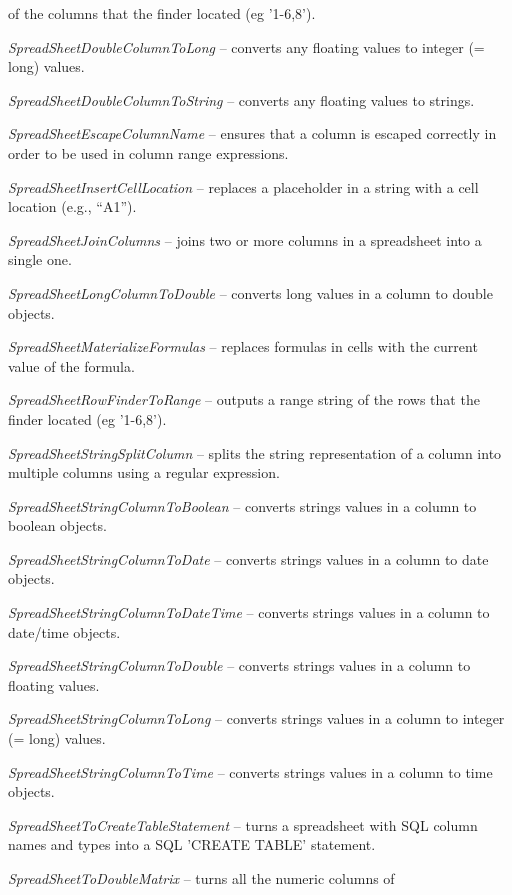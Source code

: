 \documentclass[a4paper]{book}
\begin{document}
\begin{tight_itemize}
	of the columns that the finder located (eg '1-6,8').
	\item \textit{SpreadSheetDoubleColumnToLong} -- converts any floating values
	to integer (= long) values.
	\item \textit{SpreadSheetDoubleColumnToString} -- converts any floating values
	to strings.
	\item \textit{SpreadSheetEscapeColumnName} -- ensures that a column is escaped
	correctly in order to be used in column range expressions.
	\item \textit{SpreadSheetInsertCellLocation} -- replaces a placeholder in 
	a string with a cell location (e.g., ``A1'').
	\item \textit{SpreadSheetJoinColumns} -- joins two or more columns in 
	a spreadsheet into a single one.
	\item \textit{SpreadSheetLongColumnToDouble} -- converts long values in a
	column to double objects.
	\item \textit{SpreadSheetMaterializeFormulas} -- replaces formulas in cells
	with the current value of the formula.
	\item \textit{SpreadSheetRowFinderToRange} -- outputs a range string
	of the rows that the finder located (eg '1-6,8').
	\item \textit{SpreadSheetStringSplitColumn} -- splits the string representation 
	of a column into multiple columns using a regular expression.
	\item \textit{SpreadSheetStringColumnToBoolean} -- converts strings values in a 
	column to boolean objects.
	\item \textit{SpreadSheetStringColumnToDate} -- converts strings values in a 
	column to date objects.
	\item \textit{SpreadSheetStringColumnToDateTime} -- converts strings values in a 
	column to date/time objects.
	\item \textit{SpreadSheetStringColumnToDouble} -- converts strings values in a 
	column to floating values.
	\item \textit{SpreadSheetStringColumnToLong} -- converts strings values in a 
	column to integer (= long) values.
	\item \textit{SpreadSheetStringColumnToTime} -- converts strings values in a 
	column to time objects.
	\item \textit{SpreadSheetToCreateTableStatement} -- turns a spreadsheet with
	SQL column names and types into a SQL 'CREATE TABLE' statement.
	\item \textit{SpreadSheetToDoubleMatrix} -- turns all the numeric columns of

\end{tight_itemize}
\end{document}
